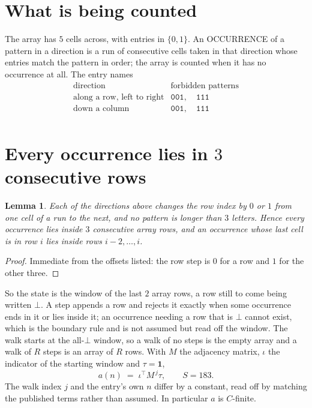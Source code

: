 \documentclass[11pt,a4paper]{article}
\theoremstyle{plain}
\newtheorem{lemma}[theorem]{Lemma}
\theoremstyle{definition}
\begin{document}
\section{What is being counted}

The array has $5$ cells across, with entries in $\{0,1\}$. An OCCURRENCE of a pattern in a
direction is a run of consecutive cells taken in that direction whose entries match the pattern
in order; the array is counted when it has no occurrence at all. The entry names
\[
\begin{array}{ll}
\text{direction} & \text{forbidden patterns} \\[2pt]
\text{along a row, left to right} & \mathtt{001},\quad \mathtt{111} \\
\text{down a column} & \mathtt{001},\quad \mathtt{111} \\
\end{array}
\]


\section{Every occurrence lies in $3$ consecutive rows}

\begin{lemma}\label{lem:win}
Each of the directions above changes the row index by $0$ or $1$ from one cell of a run to the
next, and no pattern is longer than $3$ letters. Hence every occurrence lies inside $3$
consecutive array rows, and an occurrence whose last cell is in row $i$ lies inside rows
$i-2,\dots,i$.
\end{lemma}

\begin{proof}
Immediate from the offsets listed: the row step is $0$ for a row and $1$ for the other three.
\end{proof}

So the state is the window of the last $2$ array rows, a row still to come being written
$\bot$. A step appends a row and rejects it exactly when some occurrence ends in it or lies
inside it; an occurrence needing a row that is $\bot$ cannot exist, which is the boundary rule
and is not assumed but read off the window. The walk starts at the all-$\bot$ window, so a walk
of no steps is the empty array and a walk of $R$ steps is an array of $R$ rows. With $M$ the
adjacency matrix, $\iota$ the indicator of the starting window and $\tau=\mathbf{1}$,
\[
a(n)\;=\;\iota^{\!\top}M^{\,j}\tau ,\qquad S=183.
\]
The walk index $j$ and the entry's own $n$ differ by a constant, read off by matching the
published terms rather than assumed. In particular $a$ is $C$-finite.
\end{document}
